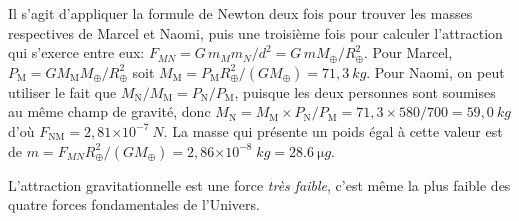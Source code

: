 \documentclass[a4paper,10pt]{report}
\newcounter{noexo}
\newenvironment{Exercise}[1][]{%
  \refstepcounter{noexo}
  \medskip\noindent\textbf{Exercice~\thenoexo~:~#1}
  \medskip\par
  \addcontentsline{toc}{paragraph}{Exercice~\thenoexo~:~#1}
  \label{exo:\thenoexo}
}{}
\newcommand{\e}[1]{\ensuremath{\times 10^{#1}}}
\renewcommand{\u}[1]{\si{#1}} %
\begin{document}
\begin{Answer}
  Il s'agit d'appliquer la formule de Newton deux fois pour trouver
  les masses respectives de Marcel et Naomi, puis une troisième fois
  pour calculer l'attraction qui s'exerce entre eux: $F_{MN} = G\,m_M
  m_N/d^2 = G\,m M_{\oplus}/R_{\oplus}^2$.  Pour Marcel,
  $P_{\mathrm{M}} = G M_{\mathrm{M}}M_{\oplus} / R_{\oplus}^2$ soit
  $M_{\mathrm{M}} = P_{\mathrm{M}}R_{\oplus}^2 / (G M_{\oplus}) =
  71,3~\u{kg}$. Pour Naomi, on peut utiliser le fait que
  $M_{\mathrm{N}}/M_{\mathrm{M}} = P_{\mathrm{N}} / P_{\mathrm{M}}$,
  puisque les deux personnes sont soumises au même champ de gravité,
  donc $M_{\mathrm{N}} = M_{\mathrm{M}}\times
  P_{\mathrm{N}}/P_{\mathrm{M}} = 71,3 \times 580/700 = 59,0~\u{kg}$
  d'où $F_{\mathrm{NM}} = 2,81\e{-7}~\u{N}.$ La masse qui présente un
  poids égal à cette valeur est de $m =
  F_{MN}R_{\oplus}^{2}/(GM_{\oplus}) = 2,86\e{-8}\;\u{kg} =
  \SI{28,6}{\micro g}$.

  L'attraction gravitationnelle est une force \emph{très faible},
  c'est même la plus faible des quatre forces fondamentales de
  l'Univers.
\end{Answer}



\end{document}
